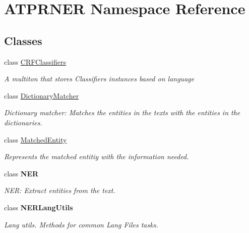 \hypertarget{namespace_a_t_p_r_n_e_r}{}\section{A\+T\+P\+R\+N\+ER Namespace Reference}
\label{namespace_a_t_p_r_n_e_r}
\subsection*{Classes}
\begin{DoxyCompactItemize}
\item 
class \hyperlink{class_a_t_p_r_n_e_r_1_1_c_r_f_classifiers}{C\+R\+F\+Classifiers}
\begin{DoxyCompactList}\small\item\em A multiton that stores Classifiers instances based on language \end{DoxyCompactList}\item 
class \hyperlink{class_a_t_p_r_n_e_r_1_1_dictionary_matcher}{Dictionary\+Matcher}
\begin{DoxyCompactList}\small\item\em Dictionary matcher\+: Matches the entities in the texts with the entities in the dictionaries. \end{DoxyCompactList}\item 
class \hyperlink{class_a_t_p_r_n_e_r_1_1_matched_entity}{Matched\+Entity}
\begin{DoxyCompactList}\small\item\em Represents the matched entitiy with the information needed. \end{DoxyCompactList}\item 
class {\bfseries N\+ER}
\begin{DoxyCompactList}\small\item\em N\+ER\+: Extract entities from the text. \end{DoxyCompactList}\item 
class {\bfseries N\+E\+R\+Lang\+Utils}
\begin{DoxyCompactList}\small\item\em Lang utils. Methods for common Lang Files tasks. \end{DoxyCompactList}\end{DoxyCompactItemize}
